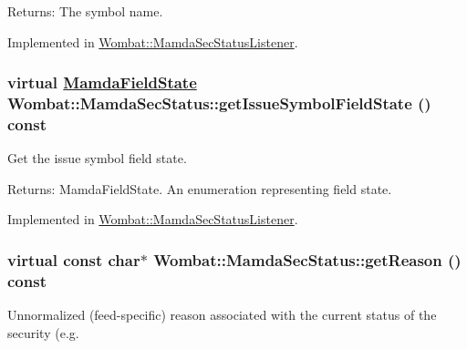 \begin{Desc}
\item[Returns:]The symbol name. \end{Desc}


Implemented in \hyperlink{classWombat_1_1MamdaSecStatusListener_8d05183ac7dac8914259842d6f860a1b}{Wombat::Mamda\-Sec\-Status\-Listener}.\hypertarget{classWombat_1_1MamdaSecStatus_9ec78fc150849e2bda7802f01d5b692c}{
\subsubsection[getIssueSymbolFieldState]{\setlength{\rightskip}{0pt plus 5cm}virtual \hyperlink{namespaceWombat_93aac974f2ab713554fd12a1fa3b7d2a}{Mamda\-Field\-State} Wombat::Mamda\-Sec\-Status::get\-Issue\-Symbol\-Field\-State () const}}
\label{classWombat_1_1MamdaSecStatus_9ec78fc150849e2bda7802f01d5b692c}


Get the issue symbol field state. 

\begin{Desc}
\item[Returns:]Mamda\-Field\-State. An enumeration representing field state. \end{Desc}


Implemented in \hyperlink{classWombat_1_1MamdaSecStatusListener_bfbb5289809053bd0864dbbec9f40edf}{Wombat::Mamda\-Sec\-Status\-Listener}.\hypertarget{classWombat_1_1MamdaSecStatus_6c6d3305ed2a2e06e8558647497a36d7}{
\subsubsection[getReason]{\setlength{\rightskip}{0pt plus 5cm}virtual const char$\ast$ Wombat::Mamda\-Sec\-Status::get\-Reason () const}}
\label{classWombat_1_1MamdaSecStatus_6c6d3305ed2a2e06e8558647497a36d7}


Unnormalized (feed-specific) reason associated with the current status of the security (e.g. 

